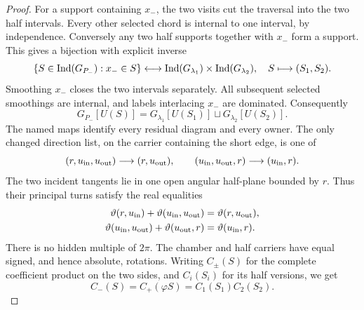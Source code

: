 \begin{proof}
For a support containing $x_-$, the two visits cut the traversal into
the two half intervals.  Every other selected chord is internal to one
interval, by independence.  Conversely any two half supports together
with $x_-$ form a support.  This gives a bijection with explicit inverse
\begin{equation}\label{s7c:sliding-bijection}
 \{S\in\operatorname{Ind}(G_{P_-}):x_-\in S\}\longleftrightarrow
 \operatorname{Ind}(G_{\lambda_1})\times\operatorname{Ind}(G_{\lambda_2}),
 \quad S\longmapsto(S_1,S_2).
\end{equation}
Smoothing $x_-$ closes the two intervals separately.  All subsequent
selected smoothings are internal, and labels interlacing $x_-$ are
dominated.  Consequently
\begin{equation}\label{s7c:sliding-residual}
 G_{P_-}[U(S)]
 =G_{\lambda_1}[U(S_1)]\sqcup G_{\lambda_2}[U(S_2)].
\end{equation}
The named maps identify every residual diagram and every owner.  The
only changed direction list, on the carrier containing the short edge,
is one of
\begin{equation}\label{s7c:short-direction-lists}
 (r,u_{\rm in},u_{\rm out})\longrightarrow(r,u_{\rm out}),
 \qquad
 (u_{\rm in},u_{\rm out},r)\longrightarrow(u_{\rm in},r).
\end{equation}
The two incident tangents lie in one open angular half-plane bounded by
$r$.  Thus their principal turns satisfy the real equalities
\begin{align}
 \vartheta(r,u_{\rm in})+\vartheta(u_{\rm in},u_{\rm out})
       &=\vartheta(r,u_{\rm out}),\label{s7c:turn-short-a}\\
 \vartheta(u_{\rm in},u_{\rm out})+\vartheta(u_{\rm out},r)
       &=\vartheta(u_{\rm in},r).\label{s7c:turn-short-b}
\end{align}
There is no hidden multiple of $2\pi$.  The chamber and half carriers
have equal signed, and hence absolute, rotations.  Writing $C_\pm(S)$
for the complete coefficient product on the two sides, and $C_i(S_i)$
for its half versions, we get
\begin{equation}\label{s7c:sliding-coefficients}
 C_-(S)=C_+(\varphi S)=C_1(S_1)C_2(S_2).
\end{equation}


\end{proof}
